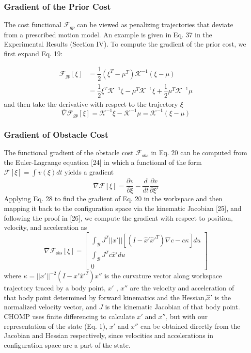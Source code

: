 \documentclass{IEEEtran}
\begin{document}
\subsubsection{Gradient of the Prior Cost}
The cost functional $\mathcal{F}_{gp}$
can be viewed as penalizing trajectories that deviate from
a prescribed motion model. An example is given in Eq. 37
in the Experimental Results (Section IV). To compute the
gradient of the prior cost, we first expand Eq. 19:

\begin{equation*}
\begin{split}
\mathcal{F}_{gp}[\xi]&=\dfrac{1}{2}(\xi^T-\mu^T)\mathcal{K}^{-1}(\xi-\mu)\\
&=\dfrac{1}{2}\xi^T\mathcal{K}^{-1}\xi-\mu^T\mathcal{K}^{-1}\xi+\dfrac{1}{2}\mu^T\mathcal{K}^{-1}\mu
\end{split}
\tag{26}
\end{equation*}
and then take the derivative with respect to the trajectory $\xi$
\begin{equation*}
\overline{\nabla}\mathcal{F}_{gp}[\xi]=\mathcal{K}^{-1}\xi-\mathcal{K}^{-1}\mu=\mathcal{K}^{-1}(\xi-\mu)\tag{27}
\end{equation*}
\subsubsection{Gradient of Obstacle Cost}
The functional gradient of
the obstacle cost $\mathcal{F}_{obs}$ in Eq. 20 can be computed from the
Euler-Lagrange equation [24] in which a functional of the
form $\mathcal{F}[\xi]=\int_{}^{}v(\xi)dt$ yields a gradient
\begin{equation*}
\overline{\nabla}\mathcal{F}[\xi]=\dfrac{\partial{v}}{\partial{\xi}}-\dfrac{d}{dt}\dfrac{\partial{v}}{\partial{\xi'}}
\tag{28}
\end{equation*}
Applying Eq. 28 to find the gradient of Eq. 20 in the
workspace and then mapping it back to the configuration
space via the kinematic Jacobian [25], and following the
proof in [26], we compute the gradient with respect to
position, velocity, and acceleration as
\[
\overline{\nabla}\mathcal{F}_{obs}[\xi]=\begin{bmatrix}
\int_{\mathcal{B}}^{}J^T||x'||[(I-\widehat{x}'\widehat{x}'^T){\nabla}c-c\kappa]du\\
\int_{\mathcal{B}}^{}J^Tc \widehat{x}'du\\
0\tag{29}
\end{bmatrix}
\]
where $\kappa=||x'||^{-2}(I-\widehat{x}'\widehat{x}'^T)x''$ is the curvature vector
along workspace trajectory traced by a body point, $x'$
, $x''$ are
the velocity and acceleration of that body point determined
by forward kinematics and the Hessian,$\widehat{x}'$
is the normalized velocity vector, and $\textit{J}$ is the kinematic
Jacobian of that body point. CHOMP uses finite differencing
to calculate $x'$
and $x''$, but with our representation of the state
(Eq. 1), $x'$
and $x''$ can be obtained directly from the Jacobian
and Hessian respectively, since velocities and accelerations
in configuration space are a part of the state.
\end{document}
